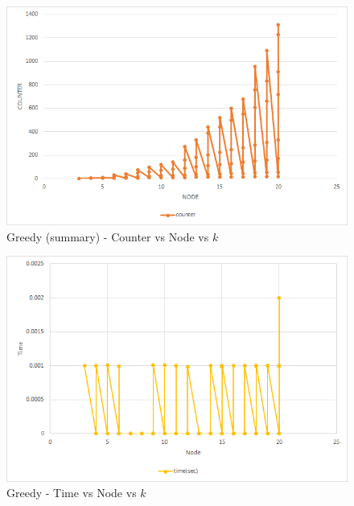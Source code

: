 \documentclass[longpaper, english, final, times]{revdetua}
\begin{document}
			\begin{figure}[!h]
				\includegraphics[width=1\linewidth]{imgs/greedyCounterNodesSummary.png}
				\caption{Greedy (summary) - Counter vs Node vs $k$}
				\label{figure:greedyCounterNodesSummary}
			\end{figure}
			
			\begin{figure}[!h]
				\includegraphics[width=1\linewidth]{imgs/greedyTimeNodes20.png}
				\caption{Greedy - Time vs Node vs $k$}
				\label{figure:greedyTimeNodes20}
			\end{figure}
			
\end{document}
